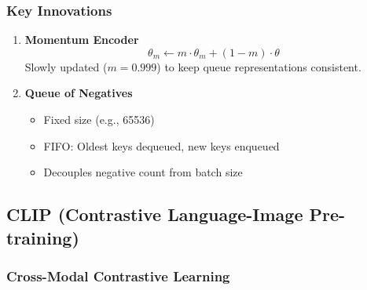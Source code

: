\subsubsection{Key Innovations}

\begin{enumerate}
    \item \textbf{Momentum Encoder}
    \begin{equation}
    \theta_m \leftarrow m \cdot \theta_m + (1 - m) \cdot \theta
    \end{equation}
    Slowly updated ($m = 0.999$) to keep queue representations consistent.
    
    \item \textbf{Queue of Negatives}
    \begin{itemize}
        \item Fixed size (e.g., 65536)
        \item FIFO: Oldest keys dequeued, new keys enqueued
        \item Decouples negative count from batch size
    \end{itemize}
\end{enumerate}

\subsection{CLIP (Contrastive Language-Image Pre-training)}

\subsubsection{Cross-Modal Contrastive Learning}

